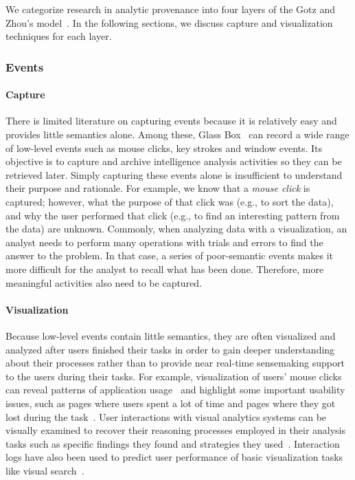 We categorize research in analytic provenance into four layers of the Gotz and Zhou's model~\cite{Gotz2009}. In the following sections, we discuss capture and visualization techniques for each layer.

\subsubsection{Events}

\paragraph{Capture}
There is limited literature on capturing events because it is relatively easy and provides little semantics alone. Among these, Glass Box~\cite{Cowley2006} can record a wide range of low-level events such as mouse clicks, key strokes and window events. Its objective is to capture and archive intelligence analysis activities so they can be retrieved later. Simply capturing these events alone is insufficient to understand their purpose and rationale. For example, we know that a \textit{mouse click} is captured; however, what the purpose of that click was (e.g., to sort the data), and why the user performed that click (e.g., to find an interesting pattern from the data) are unknown. Commonly, when analyzing data with a visualization, an analyst needs to perform many operations with trials and errors to find the answer to the problem. In that case, a series of poor-semantic events makes it more difficult for the analyst to recall what has been done. Therefore, more meaningful activities also need to be captured. 

\paragraph{Visualization}
Because low-level events contain little semantics, they are often visualized and analyzed after users finished their tasks in order to gain deeper understanding about their processes rather than to provide near real-time sensemaking support to the users during their tasks. For example, visualization of users' mouse clicks can reveal patterns of application usage~\cite{Matejka2013} and highlight some important usability issues, such as pages where users spent a lot of time and pages where they got lost during the task~\cite{Waterson2002}. User interactions with visual analytics systems can be visually examined to recover their reasoning processes employed in their analysis tasks such as specific findings they found and strategies they used~\cite{Dou2009, Guo2016}. Interaction logs have also been used to predict user performance of basic visualization tasks like visual search~\cite{Brown2014}.

